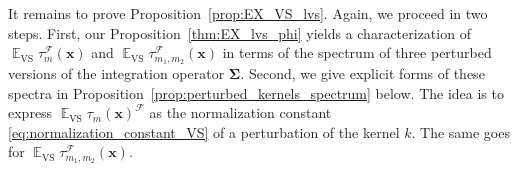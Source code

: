\documentclass[twoside,11pt]{book}
\numberwithin{theorem}{chapter}
\numberwithin{definition}{chapter}
\numberwithin{proposition}{chapter}
\numberwithin{corollary}{chapter}
\numberwithin{example}{chapter}
\numberwithin{lemma}{chapter}
\DeclareMathOperator{\Det}{Det}
\DeclareMathOperator{\VS}{\mathrm{VS}}
\DeclareMathOperator{\Tran}{\intercal}
\DeclareMathOperator{\EX}{\mathbb{E}}
\DeclareMathOperator{\F}{\mathcal{F}}
\newcommand{\rb}[1]{\textcolor{magenta}{#1}}
\begin{document}
It remains to prove Proposition~\ref{prop:EX_VS_lvs}. Again, we proceed in two steps. First, our Proposition~\ref{thm:EX_lvs_phi} yields a characterization of $ \EX_{\VS}\tau_{m}^{\F}(\bm{x})$ and $\EX_{\VS}\tau_{m_{1},m_{2}}^{\F}(\bm{x})$ in terms of the spectrum of three perturbed versions of the integration operator $\bm{\Sigma}$. Second, we give explicit forms of these spectra in Proposition~\ref{prop:perturbed_kernels_spectrum} below. The idea is to express $\EX_{\VS} \tau_{m}(\bm{x})^{\F}$ as the normalization constant \eqref{eq:normalization_constant_VS} of a perturbation of the kernel $k$.
The same goes for $\EX_{\VS} \tau_{m_{1},m_{2}}^{\F}(\bm{x})$.
\end{document}

